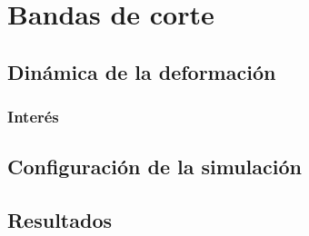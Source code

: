 
\chapter{Bandas de corte} %

\label{Chapter3} %



\section{Din\'amica de la deformaci\'on}




\subsection{Inter\'es}




\section{Configuraci\'on de la simulaci\'on}



\section{Resultados}

